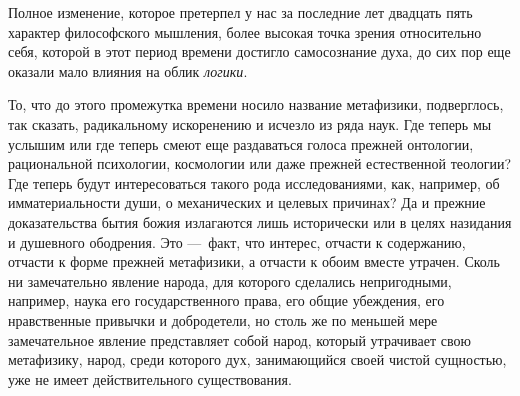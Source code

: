 \clearpage

Полное изменение, которое претерпел у нас за
последние лет двадцать пять характер философского мышления, более высокая
точка зрения относительно себя, которой в этот период времени достигло
самосознание духа, до сих пор еще оказали мало влияния на облик
{\em логики}.

То, что до этого промежутка времени носило название метафизики, подверглось,
так сказать, радикальному искоренению и исчезло из ряда наук. Где теперь мы
услышим или где теперь смеют еще раздаваться голоса прежней онтологии,
рациональной психологии, космологии или даже прежней естественной теологии?
Где теперь будут интересоваться такого рода исследованиями, как, например,
об имматериальности души, о механических и целевых причинах? Да и прежние
доказательства бытия божия излагаются лишь исторически или в целях
назидания и душевного ободрения. Это —~факт, что интерес, отчасти к
содержанию, отчасти к форме прежней метафизики, а отчасти к обоим вместе
утрачен. Сколь ни замечательно явление народа, для которого сделались
непригодными, например, наука его государственного права, его общие
убеждения, его нравственные привычки и добродетели, но столь же по меньшей
мере замечательное явление представляет собой народ, который утрачивает
свою метафизику, народ, среди которого дух, занимающийся своей чистой
сущностью, уже не имеет действительного существования.

